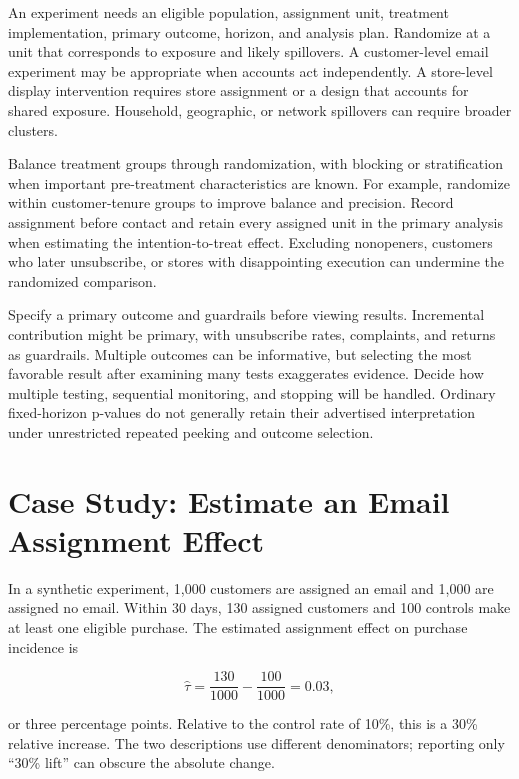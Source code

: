 \noindent An experiment needs an eligible population, assignment unit, treatment
implementation, primary outcome, horizon, and analysis plan. Randomize
at a unit that corresponds to exposure and likely spillovers. A
customer-level email experiment may be appropriate when accounts act
independently. A store-level display intervention requires store
assignment or a design that accounts for shared exposure. Household,
geographic, or network spillovers can require broader clusters.

Balance treatment groups through randomization, with blocking or
stratification when important pre-treatment characteristics are known.
For example, randomize within customer-tenure groups to improve balance
and precision. Record assignment before contact and retain every
assigned unit in the primary analysis when estimating the
intention-to-treat effect. Excluding nonopeners, customers who later
unsubscribe, or stores with disappointing execution can undermine the
randomized comparison.

Specify a primary outcome and guardrails before viewing results.
Incremental contribution might be primary, with unsubscribe rates,
complaints, and returns as guardrails. Multiple outcomes can be
informative, but selecting the most favorable result after examining
many tests exaggerates evidence. Decide how multiple testing, sequential
monitoring, and stopping will be handled. Ordinary fixed-horizon
p-values do not generally retain their advertised interpretation under
unrestricted repeated peeking and outcome selection.

\hypertarget{M06-case-study-estimate-an-email-assignment-effect}{%
\section{Case Study: Estimate an Email Assignment
Effect}\label{M06-case-study-estimate-an-email-assignment-effect}}

\noindent In a synthetic experiment, 1,000 customers are assigned an email and
1,000 are assigned no email. Within 30 days, 130 assigned customers and
100 controls make at least one eligible purchase. The estimated
assignment effect on purchase incidence is

\[
\hat\tau=\frac{130}{1000}-\frac{100}{1000}=0.03,
\]

or three percentage points. Relative to the control rate of 10\%, this
is a 30\% relative increase. The two descriptions use different
denominators; reporting only ``30\% lift'' can obscure the absolute
change.

